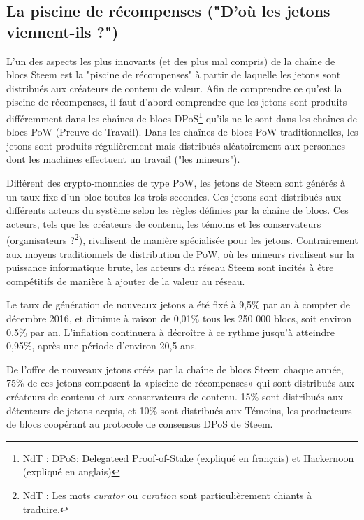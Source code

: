 \documentclass[11pt]{article}
\begin{document}
\subsection{La piscine de récompenses ("D'où les jetons viennent-ils ?")}
\label{sec:org9946c94}
L'un des aspects les plus innovants (et des plus mal compris) de la
chaîne de blocs Steem est la "piscine de récompenses" à partir de
laquelle les jetons sont distribués aux créateurs de contenu de
valeur. Afin de comprendre ce qu'est la piscine de récompenses, il
faut d'abord comprendre que les jetons sont produits différemment
dans les chaînes de blocs DPoS\footnote{NdT : DPoS: \href{https://www.liskafrica.com/guides/la-preuve-de-participation-d\%25C3\%25A9l\%25C3\%25A9gu\%25C3\%25A9-dpos}{Delegateed Proof-of-Stake} (expliqué en français) et
\href{https://hackernoon.com/explain-delegated-proof-of-stake-like-im-5-888b2a74897d}{Hackernoon} (expliqué en anglais)} qu'ils ne le sont dans les
chaînes de blocs PoW (Preuve de Travail). Dans les chaînes de blocs PoW
traditionnelles, les jetons sont produits régulièrement mais
distribués aléatoirement aux personnes dont les machines effectuent
un travail ("les mineurs"). 

Différent des crypto-monnaies de type PoW, les jetons de Steem sont
générés à un taux fixe d'un bloc toutes les trois secondes. Ces
jetons sont distribués aux différents acteurs du système selon les
règles définies par la chaîne de blocs. Ces acteurs, tels que les
créateurs de contenu, les témoins et les conservateurs
(organisateurs ?\footnote{NdT : Les mots \emph{\href{http://www.wordreference.com/enfr/curators}{curator}} ou \emph{curation} sont particulièrement
chiants à traduire.}), rivalisent de manière spécialisée pour les
jetons. Contrairement aux moyens traditionnels de distribution de
PoW, où les mineurs rivalisent sur la puissance informatique brute,
les acteurs du réseau Steem sont incités à être compétitifs de
manière à ajouter de la valeur au réseau.

Le taux de génération de nouveaux jetons a été fixé à 9,5\% par an à
compter de décembre 2016, et diminue à raison de 0,01\% tous les 250
000 blocs, soit environ 0,5\% par an. L'inflation continuera à
décroître à ce rythme jusqu'à atteindre 0,95\%, après une période
d'environ 20,5 ans.

De l'offre de nouveaux jetons créés par la chaîne de blocs Steem chaque
année, 75\% de ces jetons composent la «piscine de récompenses» qui sont
distribués aux créateurs de contenu et aux conservateurs de
contenu. 15\% sont distribués aux détenteurs de jetons acquis, et
10\% sont distribués aux Témoins, les producteurs de blocs coopérant
au protocole de consensus DPoS de Steem.
\end{document}
